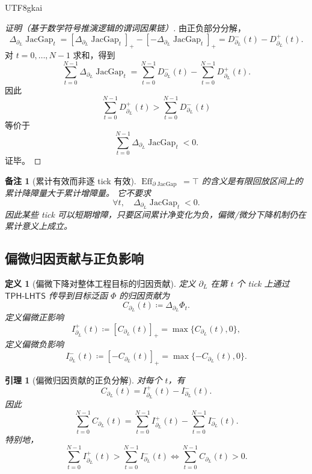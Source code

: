 \documentclass[12pt]{article}
\newtheorem{definition}{定义}[section]
\newtheorem{lemma}{引理}[section]
\newtheorem{remark}{备注}[section]
\newcommand{\DefEq}{\coloneqq}
\newcommand{\TPHLHTS}{\ensuremath{\mathsf{TPH\mbox{-}LHTS}}}
\DeclareMathOperator{\Eff}{Eff}
\DeclareMathOperator{\JacGap}{JacGap}
\begin{document}
\begin{CJK*}{UTF8}{gkai}
\begin{proof}[证明（基于数学符号推演逻辑的谓词因果链）]
由正负部分分解，
\[
  \Delta_{\partial_L}\JacGap_t
  =
  [\Delta_{\partial_L}\JacGap_t]_+
  -
  [-\Delta_{\partial_L}\JacGap_t]_+
  =
  D^-_{\partial_L}(t)-D^+_{\partial_L}(t).
\]
对 \(t=0,\ldots,N-1\) 求和，得到
\[
  \sum_{t=0}^{N-1}\Delta_{\partial_L}\JacGap_t
  =
  \sum_{t=0}^{N-1}D^-_{\partial_L}(t)
  -
  \sum_{t=0}^{N-1}D^+_{\partial_L}(t).
\]
因此
\[
  \sum_{t=0}^{N-1}D^+_{\partial_L}(t)
  >
  \sum_{t=0}^{N-1}D^-_{\partial_L}(t)
\]
等价于
\[
  \sum_{t=0}^{N-1}\Delta_{\partial_L}\JacGap_t<0.
\]
证毕。
\end{proof}

\begin{remark}[累计有效而非逐 tick 有效]
\(\Eff_{\partial\JacGap}=\top\) 的含义是有限回放区间上的累计降障量大于累计增障量。
它不要求
\[
  \forall t,\quad \Delta_{\partial_L}\JacGap_t<0.
\]
因此某些 tick 可以短期增障，只要区间累计净变化为负，偏微/微分下降机制仍在累计意义上成立。
\end{remark}

\subsection{偏微归因贡献与正负影响}
\label{subsec:tex58-partial-impact-decomposition}

\begin{definition}[偏微下降对整体工程目标的归因贡献]
\label{def:tex58-partial-contribution}
定义 \(\partial_L\) 在第 \(t\) 个 tick 上通过 \TPHLHTS{} 传导到目标泛函 \(\Phi\) 的归因贡献为
\[
  C_{\partial_L}(t)
  \DefEq
  \Delta_{\partial_L}\Phi_t.
\]
定义偏微正影响
\[
  I^+_{\partial_L}(t)
  \DefEq
  [C_{\partial_L}(t)]_+
  =
  \max\{C_{\partial_L}(t),0\},
\]
定义偏微负影响
\[
  I^-_{\partial_L}(t)
  \DefEq
  [-C_{\partial_L}(t)]_+
  =
  \max\{-C_{\partial_L}(t),0\}.
\]
\end{definition}

\begin{lemma}[偏微归因贡献的正负分解]
\label{lem:tex58-impact-decomposition}
对每个 \(t\)，有
\[
  C_{\partial_L}(t)
  =
  I^+_{\partial_L}(t)-I^-_{\partial_L}(t).
\]
因此
\[
  \sum_{t=0}^{N-1}C_{\partial_L}(t)
  =
  \sum_{t=0}^{N-1}I^+_{\partial_L}(t)
  -
  \sum_{t=0}^{N-1}I^-_{\partial_L}(t).
\]
特别地，
\[
  \sum_{t=0}^{N-1}I^+_{\partial_L}(t)
  >
  \sum_{t=0}^{N-1}I^-_{\partial_L}(t)
  \Longleftrightarrow
  \sum_{t=0}^{N-1}C_{\partial_L}(t)>0.
\]
\end{lemma}


\end{CJK*}
\end{document}
